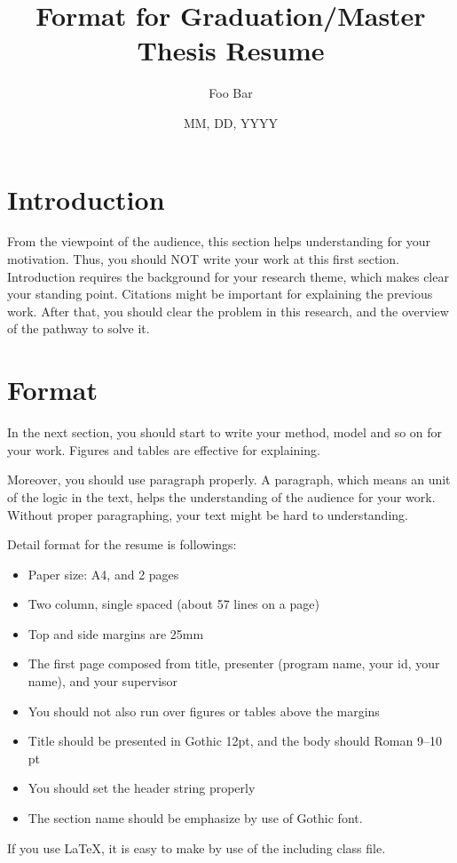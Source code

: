 \documentclass[twocolumn, a4paper]{UECIEresumeE}
\title{Format for Graduation/Master Thesis Resume}
\date{MM, DD, YYYY}
\affiliation{XXX program, cluster I}
\author{Foo Bar}
\begin{document}
\maketitle

\section{Introduction}

From the viewpoint of the audience, this section helps understanding for your motivation.
Thus, you should NOT write your work at this first section.
Introduction requires the background for your research theme, 
which makes clear your standing point.
Citations might be important for explaining the previous work.
After that, you should clear the problem in this research, and the overview of the pathway to solve it.

\section{Format}

In the next section, you should start to write your method, model and so on for your work.
Figures and tables are effective for explaining.

Moreover, you should use paragraph properly. 
A paragraph, which means an unit of the logic in the text, helps the understanding of the audience for your work. Without proper paragraphing, your text might be hard to understanding.

Detail format for the resume is followings:
\begin{itemize}
  \item Paper size: A4, and 2 pages
  \item Two column, single spaced (about 57 lines on a page)
  \item Top and side margins are 25mm
  \item The first page composed from title, presenter (program name, your id, your name), and your supervisor
  \item You should not also run over figures or tables above the margins
  \item Title should be presented in Gothic 12pt, and the body should Roman 9--10 pt
  \item You should set the header string properly
  \item The section name should be emphasize by use of Gothic font.
\end{itemize}
If you use \LaTeX, it is easy to make by use of the including class file.
\end{document}
